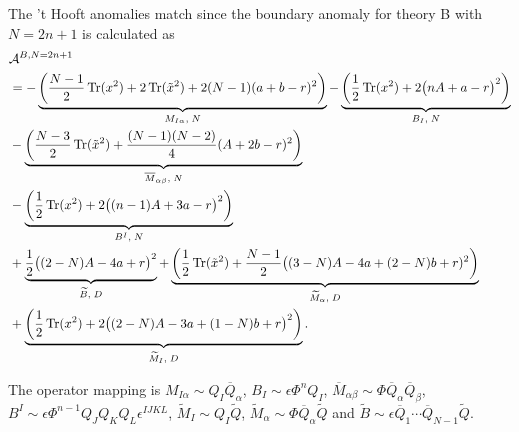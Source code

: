 \documentclass[12pt]{article}
\newcommand{\Acal}{\mathcal{A}}
\DeclareMathOperator*{\Tr}{{\rm Tr}}
\numberwithin{equation}{section}
\begin{document}
The 't Hooft anomalies match since 
the boundary anomaly for theory B with $N=2n+1$ is calculated as
\begin{align}
&
\Acal^{B, N=2n+1} 
\nonumber\\
&=  - \underbrace{\left( \frac{N-1}{2} \Tr(x^2) + 2\Tr(\tilde{x}^2) + 2(N-1)(a+b-r)^2 \right)}_{M_{I \alpha}, \; N}
  - \underbrace{\left( \frac{1}{2}\Tr(x^2) + 2\big( nA + a - r \big)^2 \right)}_{B_I, \; N}
  \nonumber \\
 & - \underbrace{\left( \frac{N-3}{2} \Tr(\tilde{x}^2) + \frac{(N-1)(N-2)}{4}(A + 2b - r)^2 \right)}_{\overline{M}_{\alpha \beta}, \; N}
  \nonumber \\
 & - \underbrace{\left( \frac{1}{2}\Tr(x^2) + 2\big( (n-1)A + 3a - r \big)^2 \right)}_{B^I, \; N}
   \nonumber \\
 & + \underbrace{\frac{1}{2}\big( (2-N)A - 4a + r \big)^2}_{\widetilde{B}, \; D}
 + \underbrace{\left( \frac{1}{2} \Tr(\tilde{x}^2) + \frac{N-1}{2}\big( (3-N)A - 4a +(2-N)b + r)^2 \right)}_{\widetilde{M}_{\alpha}, \; D}
  \nonumber \\
  & + \underbrace{\left( \frac{1}{2} \Tr(x^2) + 2\big( (2-N)A - 3a + (1-N)b + r \big)^2 \right)}_{\widetilde{M}_I, \; D}. 
  \end{align}

The operator mapping is $M_{I \alpha} \sim Q_I \overline{Q}_{\alpha}$, $B_I \sim \epsilon \Phi^n Q_I$, $\overline{M}_{\alpha \beta} \sim \Phi \overline{Q}_{\alpha} \overline{Q}_{\beta}$, $B^I \sim \epsilon \Phi^{n-1} Q_J Q_K Q_L \epsilon^{IJKL}$, $\widetilde{M}_I \sim Q_I \widetilde{Q}$, $\widetilde{M}_{\alpha} \sim \Phi \overline{Q}_{\alpha} \widetilde{Q}$ and $\widetilde{B} \sim \epsilon \overline{Q}_1 \cdots \overline{Q}_{N-1} \widetilde{Q}$.
\end{document}
